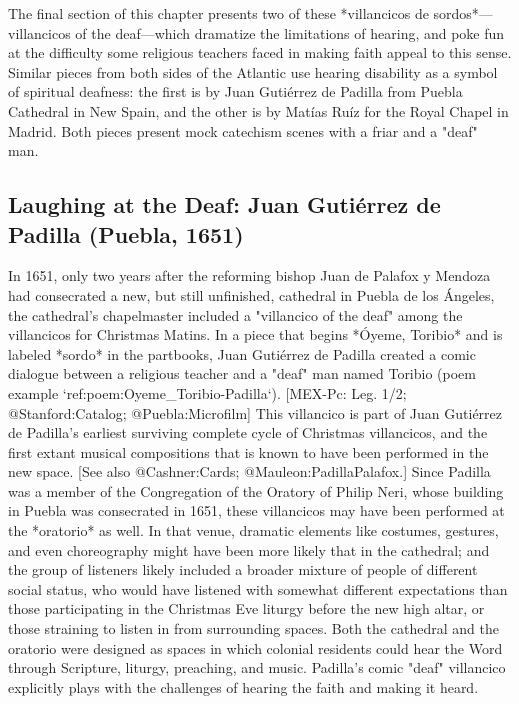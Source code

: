The final section of this chapter presents two of these *villancicos de
sordos*---villancicos of the deaf---which dramatize the limitations of hearing,
and poke fun at the difficulty some religious teachers faced in making faith
appeal to this sense. 
Similar pieces from both sides of the Atlantic use hearing disability as a
symbol of spiritual deafness: the first is by Juan Gutiérrez de Padilla from
Puebla Cathedral in New Spain, and the other is by Matías Ruíz for the Royal
Chapel in Madrid. 
Both pieces present mock catechism scenes with a friar and a "deaf" man.


\subsection{Laughing at the Deaf: Juan Gutiérrez de Padilla (Puebla, 1651)}


In 1651, only two years after the reforming bishop Juan de Palafox y Mendoza had
consecrated a new, but still unfinished, cathedral in Puebla de los Ángeles, the
cathedral's chapelmaster included a "villancico of the deaf" among the
villancicos for Christmas Matins.
In a piece that begins *Óyeme, Toribio* and is labeled *sordo* in the partbooks, 
Juan Gutiérrez de Padilla created a comic dialogue between a religious teacher
and a "deaf" man named Toribio (poem example `ref:poem:Oyeme_Toribio-Padilla`).
[MEX-Pc: Leg. 1/2; @Stanford:Catalog; @Puebla:Microfilm]
This villancico is part of Juan Gutiérrez de Padilla's earliest surviving complete
cycle of Christmas villancicos, and the first extant musical compositions that
is known to have been performed in the new space.
[See also @Cashner:Cards; @Mauleon:PadillaPalafox.]
Since Padilla was a member of the Congregation of the Oratory of Philip Neri,
whose building in Puebla was consecrated in 1651, these villancicos may have
been performed at the *oratorio* as well.
In that venue, dramatic elements like costumes, gestures, and even choreography
might have been more likely that in the cathedral; and the group of listeners
likely included a broader mixture of people of different social status, who
would have listened with somewhat different expectations than those
participating in the Christmas Eve liturgy before the new high altar, or those
straining to listen in from surrounding spaces.
Both the cathedral and the oratorio were designed as spaces in which colonial
residents could hear the Word through Scripture, liturgy, preaching, and music.
Padilla's comic "deaf" villancico explicitly plays with the challenges of
hearing the faith and making it heard.

